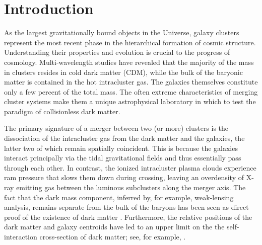 \documentclass[iop,twocolappendix]{emulateapj}
\begin{document}

\section{Introduction}\label{sec:intro}
As the largest gravitationally bound objects in the Universe, galaxy clusters represent the most
recent phase in the hierarchical formation of cosmic structure. Understanding their properties 
and evolution is crucial to the progress of cosmology. Multi-wavelength studies
have revealed that the majority of the mass in clusters resides in cold dark matter (CDM), while the
bulk of the baryonic matter is contained in the hot intracluster gas. The galaxies themselves
constitute only a few percent of the total mass. The often extreme characteristics of merging 
cluster systems make them a unique astrophysical laboratory in which to test the paradigm of 
collisionless dark matter. 

The primary signature of a merger between two (or more) clusters is the dissociation
of the intracluster gas from the dark matter and the galaxies, the latter two of which remain 
spatially coincident. 
This is because the galaxies interact principally via the tidal gravitational fields and thus 
essentially pass through each other. In contrast, the ionized intracluster plasma clouds 
experience ram pressure that slows them down during crossing, leaving an overdensity of X-ray 
emitting gas between the luminous subclusters along the merger axis. The fact that the dark
mass component, inferred by, for example, weak-lensing analysis, remains separate from the bulk 
of the baryons has been seen as direct proof of the existence of dark matter 
\citep{CGM.2004, CBG.etal.2006}.
Furthermore, the relative positions of the dark matter and galaxy centroids have led to
an upper limit on the the self-interaction cross-section of dark matter; see, for example,
\citet{MGC.etal.2004, RMC.etal.2008, Bradac2008, KSHF.etal.2014, Harvey2015, RME.2017}. 
\end{document}
